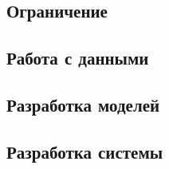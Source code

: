 \sloppy
\subsection{Ограничение}
\label{sec:limitations}


\subsection{Работа с данными}
\label{sec:data_governance}


\subsection{Разработка моделей}


\subsection{Разработка системы}
\label{sec:sys_dev}
